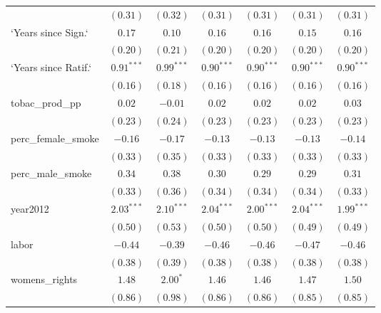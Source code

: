 \begin{table}[!h]
\begin{center}
\begin{tabular}{l c c c c c c }
                        & $(0.31)$     & $(0.32)$     & $(0.31)$     & $(0.31)$     & $(0.31)$     & $(0.31)$     \\
`Years since Sign.`     & $0.17$       & $0.10$       & $0.16$       & $0.16$       & $0.15$       & $0.16$       \\
                        & $(0.20)$     & $(0.21)$     & $(0.20)$     & $(0.20)$     & $(0.20)$     & $(0.20)$     \\
`Years since Ratif.`    & $0.91^{***}$ & $0.99^{***}$ & $0.90^{***}$ & $0.90^{***}$ & $0.90^{***}$ & $0.90^{***}$ \\
                        & $(0.16)$     & $(0.18)$     & $(0.16)$     & $(0.16)$     & $(0.16)$     & $(0.16)$     \\
tobac\_prod\_pp         & $0.02$       & $-0.01$      & $0.02$       & $0.02$       & $0.02$       & $0.03$       \\
                        & $(0.23)$     & $(0.24)$     & $(0.23)$     & $(0.23)$     & $(0.23)$     & $(0.23)$     \\
perc\_female\_smoke     & $-0.16$      & $-0.17$      & $-0.13$      & $-0.13$      & $-0.13$      & $-0.14$      \\
                        & $(0.33)$     & $(0.35)$     & $(0.33)$     & $(0.33)$     & $(0.33)$     & $(0.33)$     \\
perc\_male\_smoke       & $0.34$       & $0.38$       & $0.30$       & $0.29$       & $0.29$       & $0.31$       \\
                        & $(0.33)$     & $(0.36)$     & $(0.34)$     & $(0.34)$     & $(0.34)$     & $(0.33)$     \\
year2012                & $2.03^{***}$ & $2.10^{***}$ & $2.04^{***}$ & $2.00^{***}$ & $2.04^{***}$ & $1.99^{***}$ \\
                        & $(0.50)$     & $(0.53)$     & $(0.50)$     & $(0.50)$     & $(0.49)$     & $(0.49)$     \\
labor                   & $-0.44$      & $-0.39$      & $-0.46$      & $-0.46$      & $-0.47$      & $-0.46$      \\
                        & $(0.38)$     & $(0.39)$     & $(0.38)$     & $(0.38)$     & $(0.38)$     & $(0.38)$     \\
womens\_rights          & $1.48$       & $2.00^{*}$   & $1.46$       & $1.46$       & $1.47$       & $1.50$       \\
                        & $(0.86)$     & $(0.98)$     & $(0.86)$     & $(0.86)$     & $(0.85)$     & $(0.85)$     \\

\end{tabular}
\end{center}
\end{table}
